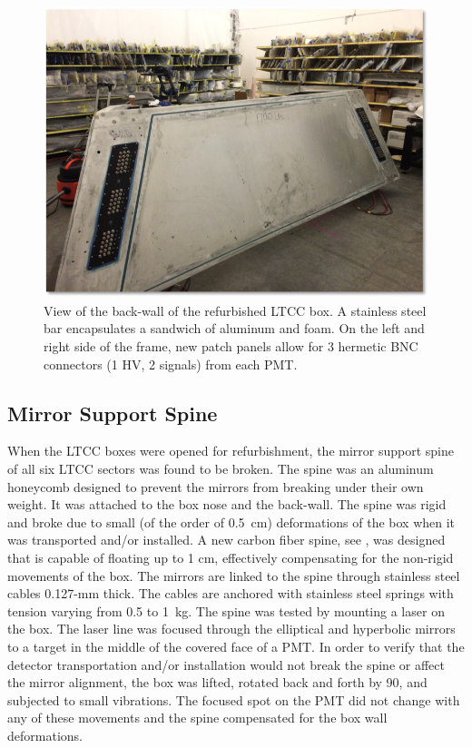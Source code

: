 \begin{figure}
	\centering
	\includegraphics[width=0.99\columnwidth,keepaspectratio]{img/backWall.png}
	\caption{View of the back-wall of the refurbished LTCC box. A stainless steel bar encapsulates a sandwich
             of aluminum and foam. On the left and right side of the frame, new patch panels allow for 3 hermetic
             BNC connectors (1 HV, 2 signals) from each PMT. }
	\label{fig:backWall}
\end{figure}

\subsection{Mirror Support Spine}

When the LTCC boxes were opened for refurbishment, the mirror support spine of all six LTCC sectors was found to be broken.
The spine was an aluminum honeycomb designed to prevent the mirrors from breaking under their own weight.
It was attached to the box nose and the back-wall. The spine was rigid and broke due to small
(of the order of 0.5~cm) deformations of the box when it was transported and/or installed.
A new carbon fiber spine, see , was designed that is capable of floating up to 1 cm, effectively compensating
for the non-rigid movements of the box.
The mirrors are linked to the spine through stainless steel cables 0.127-mm thick.
The cables are anchored with stainless steel springs with tension varying from 0.5 to 1~kg.
The spine was tested by mounting a laser on the box. The laser line was focused through the elliptical
and hyperbolic mirrors to a target in the middle of the covered face of a PMT.
In order to verify that the detector transportation and/or installation would not break the spine
or affect the mirror alignment, the box was lifted, rotated back and forth by 90\mdeg, and subjected
to small vibrations. The focused spot on the PMT did not change with any of these movements and
the spine
compensated for the box wall deformations.


